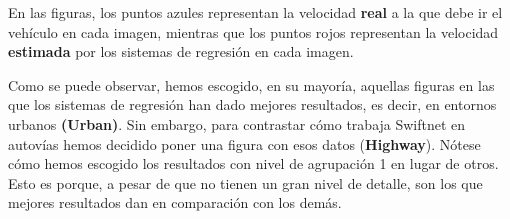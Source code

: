 En las figuras, los puntos azules representan la velocidad \textbf{real} a la que debe ir el vehículo en cada imagen, mientras que los puntos rojos representan la velocidad \textbf{estimada} por los sistemas de regresión en cada imagen.

Como se puede observar, hemos escogido, en su mayoría, aquellas figuras en las que los sistemas de regresión han dado mejores resultados, es decir, en entornos urbanos \textbf{(Urban)}. Sin embargo, para contrastar cómo trabaja Swiftnet en autovías hemos decidido poner una figura con esos datos (\textbf{Highway}). Nótese cómo hemos escogido los resultados con nivel de agrupación 1 en lugar de otros. Esto es porque, a pesar de que no tienen un gran nivel de detalle, son los que mejores resultados dan en comparación con los demás.

